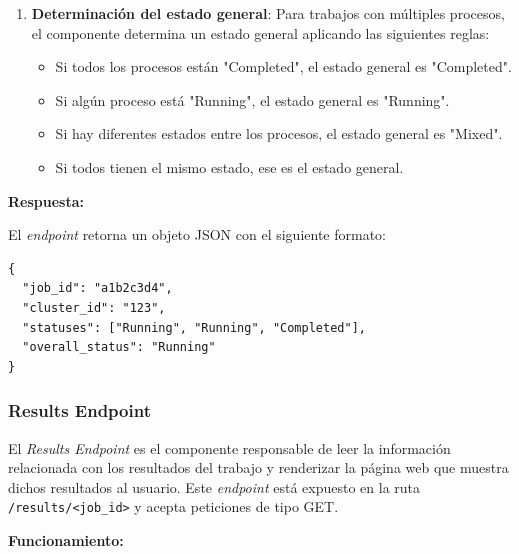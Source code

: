 \begin{enumerate}
	\item \textbf{Determinación del estado general}: Para trabajos con múltiples procesos, el componente determina un estado general aplicando las siguientes reglas:
	      \begin{itemize}
		      \item Si todos los procesos están "Completed", el estado general es "Completed".
		      \item Si algún proceso está "Running", el estado general es "Running".
		      \item Si hay diferentes estados entre los procesos, el estado general es "Mixed".
		      \item Si todos tienen el mismo estado, ese es el estado general.
	      \end{itemize}
\end{enumerate}

\textbf{Respuesta:}

El \textit{endpoint} retorna un objeto JSON con el siguiente formato:

\begin{verbatim}
{
  "job_id": "a1b2c3d4",
  "cluster_id": "123",
  "statuses": ["Running", "Running", "Completed"],
  "overall_status": "Running"
}
\end{verbatim}

\subsubsection{Results Endpoint}
\noindent

El \textit{Results Endpoint} es el componente responsable de leer la información relacionada con los resultados del trabajo y renderizar la página web que muestra dichos resultados al usuario. Este \textit{endpoint} está expuesto en la ruta \texttt{/results/<job\_id>} y acepta peticiones de tipo GET.

\textbf{Funcionamiento:}

